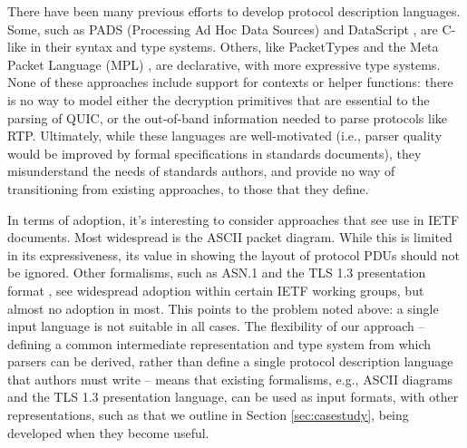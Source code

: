 \documentclass[10pt,sigconf]{acmart}
\begin{document}
%
% 

There have been many previous efforts to develop protocol description languages.
Some, such as PADS (Processing Ad Hoc Data Sources)
\cite{fisher2005pads} and DataScript \cite{back2002datascript}, are C-like in their syntax
and type systems. Others, like PacketTypes \cite{mccann2000packet} and the Meta Packet
Language (MPL) \cite{madhavapeddy2007melange}, are declarative, with more expressive type
systems. None of these approaches include support for contexts or helper functions: there
is no way to model either the decryption primitives that are essential to the parsing of
QUIC, or the out-of-band information needed to parse protocols like RTP.
Ultimately, while these languages are well-motivated (i.e., parser quality
would be improved by formal specifications in standards documents), they
misunderstand the needs of standards authors, and provide no way of
transitioning from existing approaches, to those that they define.

In terms of adoption, it's interesting to consider approaches that see use in IETF
documents. Most widespread is the ASCII packet diagram. While this is
limited in its expressiveness, its value in showing the layout of protocol PDUs should not
be ignored. Other formalisms, such as ASN.1 \cite{x680} and the TLS 1.3 presentation
format \cite{draft-ietf-tls-tls13-28}, see widespread adoption within certain IETF
working groups, but almost no adoption in most. This points to the problem noted above: a
single input language is not suitable in all cases. The flexibility of our approach --
defining a common intermediate representation and type system from which
parsers can be derived, rather than define a single protocol description language
that authors must write -- means that existing formalisms, e.g., ASCII
diagrams and the TLS 1.3 presentation language, can be used as input
formats, with other representations, such as that we outline in Section
\ref{sec:casestudy}, being developed when they become useful. 
\end{document}
